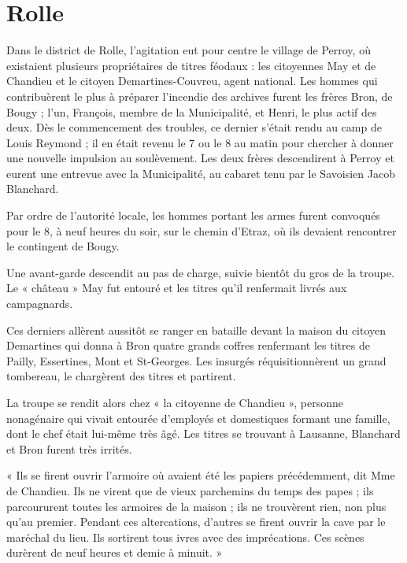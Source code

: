 \documentclass[french,twoside]{book} %
\newenvironment{quoteblock}%
  {\begin{quoting}}
  {\end{quoting}}
\newenvironment{quotebar}{%
    \def\FrameCommand{{\color{rubric!10!}\vrule width 0.5em} \hspace{0.9em}}%
    \def\OuterFrameSep{\itemsep} %
    \MakeFramed {\advance\hsize-\width \FrameRestore}
  }%
  {%
    \endMakeFramed
  }
\renewenvironment{quoteblock}%
  {%
    \savenotes
    \setstretch{0.9}
    \begin{quotebar}
  }
  {%
    \end{quotebar}
    \spewnotes
  }
\begin{document}
\section[Rolle]{Rolle}
\noindent Dans le district de Rolle, l’agitation eut pour centre le village de Perroy, où existaient plusieurs propriétaires de titres féodaux : les citoyennes May et de Chandieu et le citoyen Demartines-Couvreu, agent national. Les hommes qui contribuèrent le plus à préparer l’incendie des archives furent les frères Bron, de Bougy ; l’un, François, membre de la Municipalité, et Henri, le plus actif des deux. Dès le commencement des troubles, ce dernier s’était rendu au camp de Louis Reymond ; il en était revenu le 7 ou le 8 au matin pour chercher à donner une nouvelle impulsion au soulèvement. Les deux frères descendirent à Perroy et eurent une entrevue avec la Municipalité, au cabaret tenu par le Savoisien Jacob Blanchard.\par
Par ordre de l’autorité locale, les hommes portant les armes furent convoqués pour le 8, à neuf heures du soir, sur le chemin d’Etraz, où ils devaient rencontrer le contingent de Bougy.\par
Une avant-garde descendit au pas de charge, suivie bientôt du gros de la troupe. Le « château » May fut entouré et les titres qu’il renfermait livrés aux campagnards.\par
Ces derniers allèrent aussitôt se ranger en bataille devant la maison du citoyen Demartines qui donna à Bron quatre grands coffres renfermant les titres de Pailly, Essertines, Mont et St-Georges. Les insurgés réquisitionnèrent un grand tombereau, le chargèrent des titres et partirent.\par
La troupe se rendit alors chez « la citoyenne de Chandieu », personne nonagénaire qui vivait entourée d’employés et domestiques formant une famille, dont le chef était lui-même très âgé. Les titres se trouvant à Lausanne, Blanchard et Bron furent très irrités.\par

\begin{quoteblock}
 \noindent « Ils se firent ouvrir l’armoire où avaient été les papiers précédemment, dit Mme de Chandieu. Ils ne virent que de vieux parchemins du temps des papes ; ils parcoururent toutes les armoires de la maison ; ils ne trouvèrent rien, non plus qu’au premier. Pendant ces altercations, d’autres se firent ouvrir la cave par le maréchal du lieu. Ils sortirent tous ivres avec des imprécations. Ces scènes durèrent de neuf heures et demie à minuit. »
 \end{quoteblock}
\end{document}
